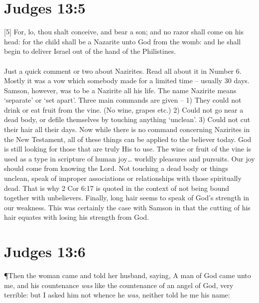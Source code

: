 \section{Judges 13:5}
[5] \textcolor[rgb]{0.00,0.00,1.00}{For, lo, thou shalt conceive, and bear a son; and no razor shall come on his head: for the child shall be a Nazarite unto God from the womb: and he shall begin to deliver Israel out of the hand of the Philistines.}\\
\\
Just a quick comment or two about Nazirites. Read all about it in Number 6. Mostly it was a vow which somebody made for a limited time -- usually 30 days. Samson, however, was to be a Nazirite all his life. The name Nazirite means ‘separate’ or ‘set apart’. Three main commands are given – 1) They could not drink or eat fruit from the vine. (No wine, grapes etc.) 2) Could not go near a dead body, or defile themselves by touching anything ‘unclean’. 3) Could not cut their hair all their days. Now while there is no command concerning Nazirites in the New Testament, all of these things can be applied to the believer today. God is still looking for those that are truly His to use. The wine or fruit of the vine is used as a type in scripture of human joy… worldly pleasures and pursuits. Our joy should come from knowing the Lord. Not touching a dead body or things unclean, speak of improper associations or relationships with those spiritually dead. That is why 2 Cor 6:17 is quoted in the context of not being bound together with unbelievers. Finally, long hair seems to speak of God’s strength in our weakness. This was certainly the case with Samson in that the cutting of his hair equates with losing his strength from God.
\section{Judges 13:6}
\P \textcolor[rgb]{0.00,0.00,1.00}{Then the woman came and told her husband, saying, A man of God came unto me, and his countenance \emph{was} like the countenance of an angel of God, very terrible: but I asked him not whence he \emph{was}, neither told he me his name:}

